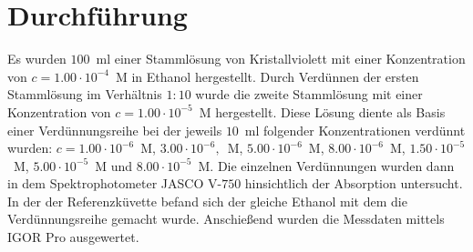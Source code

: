 %
%

\section{Durchführung}
Es wurden $100$~ml einer Stammlösung von Kristallviolett mit einer Konzentration von $c = 1.00 \cdot 10^{-4}$~M in Ethanol hergestellt. Durch Verdünnen der ersten Stammlösung im Verhältnis $1:10$ wurde die zweite Stammlösung mit einer Konzentration von $c = 1.00 \cdot 10^{-5}$~M hergestellt. Diese Lösung diente als Basis einer Verdünnungsreihe bei der jeweils $10$~ml folgender Konzentrationen verdünnt wurden: $c=1.00 \cdot 10^{-6}$~M, $3.00 \cdot 10^{-6},$~M, $5.00 \cdot 10^{-6}$~M, $8.00 \cdot 10^{-6}$~M, $1.50 \cdot 10^{-5}$~M, $5.00 \cdot 10^{-5}$~M und $8.00 \cdot 10^{-5}$~M. Die einzelnen Verdünnungen wurden dann in dem Spektrophotometer JASCO V-$750$ hinsichtlich der Absorption untersucht. In der der Referenzküvette befand sich der gleiche Ethanol mit dem die Verdünnungsreihe gemacht wurde. Anschießend wurden die Messdaten mittels IGOR Pro ausgewertet.



%

